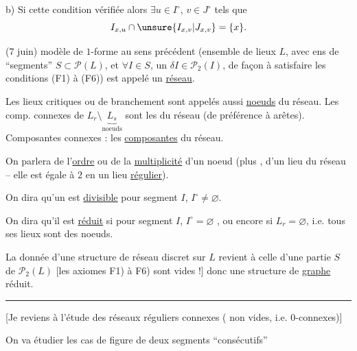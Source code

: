 b) Si cette condition  vérifiée alors $\exists u\in I^\circ$, $v\in J^\circ$ tels que
\[
I_{x,u}\cap\unsure{I_{x,v}|J_{x,v}}=\{x\}.
\]




(7 juin)  modèle de $1$-forme au sens précédent (ensemble de lieux $L$, avec ens de ``segments'' $S\subset\mathcal P(L)$, et $\forall I\in S$, un $\delta I\in\mathcal P_2(I)$,  de façon à satisfaire les conditions (F1) à (F6)) est appelé un \uline{réseau}.

Les lieux critiques  ou de branchement sont appelés aussi \uline{noeuds} du réseau. Les comp. connexes de $L_r\setminus\underset{\text{noeuds}}{\underbrace{L_s}}$ sont  les  du réseau (de préférence à arêtes). Composantes connexes : les \uline{composantes} du réseau.

On parlera de l'\uline{ordre} ou de la \uline{multiplicité} d'un noeud (plus , d'un lieu du réseau -- elle est égale à $2$ en un lieu \uline{régulier}).

On dira qu'un   est \uline{divisible}  pour  segment $I$, $I^\circ\ne\varnothing$.

On dira qu'il est \uline{réduit} si pour  segment $I$, $I^\circ=\varnothing$ , ou encore si $L_r=\varnothing$, i.e. tous ses lieux sont des noeuds.



La donnée d'une structure de réseau discret sur $L$ revient à celle d'une  partie $S$ de $\mathcal P_2(L)$
[les axiomes F1) à F6) sont vides !]
donc une structure de \uline{graphe} réduit.

\begin{center}\rule{0.9cm}{0.7pt}\end{center}

[Je reviens à l'étude des réseaux réguliers  connexes ( non vides, i.e. 0-connexes)]

On va étudier les cas de figure de deux segments ``consécutifs''

